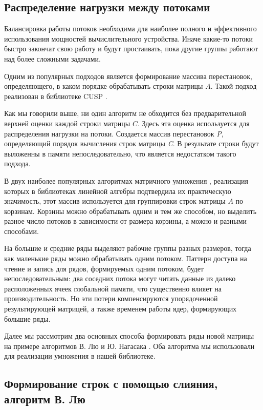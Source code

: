 \documentclass[14pt]{extarticle}
\newcommand{\txt}{\textit}
\begin{document}
	\subsection*{Распределение нагрузки между потоками} 
	
	
	Балансировка работы потоков необходима для наиболее полного и эффективного использования мощностей вычислительного устройства. Иначе какие-то потоки быстро закончат свою работу и будут простаивать, пока другие группы работают над более сложными задачами.
	
	Одним из популярных подходов является формирование массива перестановок, определяющего, в каком порядке обрабатывать строки матрицы $A$. Такой подход реализован в библиотеке CUSP \cite{dalton}.
	
	Как мы говорили выше, ни один алгоритм не обходится без предварительной верхней оценки каждой строки матрицы $C$. Здесь эта оценка используется для распределения нагрузки на потоки. Создается массив перестановок \txt{P}, определяющий порядок вычисления строк матрицы \txt{C}. В результате строки будут выложенны в памяти непоследовательно, что является недостатком такого подхода.
	
	В двух наиболее популярных алгоритмах матричного умножения \cite{liu, nagasaka}, реализация которых в библиотеках линейной алгебры подтвердила их практическую значимость, этот массив используется для группировки строк матрицы $A$ по корзинам. Корзины можно обрабатывать одним и тем же способом, но выделить разное число потоков в зависимости от размера корзины, а можно и разными способами. 
	
	На большие и средние ряды выделяют рабочие группы разных размеров, тогда как маленькие ряды можно обрабатывать одним потоком. Паттерн доступа на чтение и запись для рядов, формируемых одним потоком, будет непоследовательным: два соседних потока могут читать данные из далеко расположенных ячеек глобальной памяти, что существенно влияет на производительность. Но эти потери компенсируются упорядоченной результирующей матрицей, а также временем работы ядер, формирующих большие ряды. 
	
	Далее мы рассмотрим два основных способа формировать ряды новой матрицы на примере алгоритмов В. Лю \cite{liu} и Ю. Нагасака \cite{nagasaka}. Оба алгоритма мы использовали для реализации умножения в нашей библиотеке.
	
	\subsection*{Формирование строк с помощью слияния, алгоритм В. Лю}
	
\end{document}
